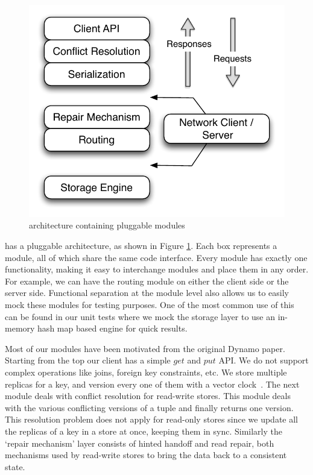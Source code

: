 \begin{figure}
  \centering
    \includegraphics[scale=0.55]{images/arch.pdf}
  \caption{\projectname{} architecture containing pluggable modules}
  \label{arch}
\end{figure}

\projectname{} has a pluggable architecture, as shown in Figure \ref{arch}. Each box represents a module, all of which share the same code interface. Every module has exactly one functionality, making it easy to interchange modules and place them in any order. For example, we can have the routing module on either the client side or the server side. Functional separation at the module level also allows us to easily mock these modules for testing purposes. One of the most common use of this can be found in our unit tests where we mock the storage layer to use an in-memory hash map based engine for quick results.  

Most of our modules have been motivated from the original Dynamo paper. Starting from the top our client has a simple $get$ and $put$ API. We do not support complex operations like joins, foreign key constraints, etc. We store multiple replicas for a key, and version every one of them with a vector clock~\cite{lamport}. The next module deals with conflict resolution for read-write stores. This module deals with the various conflicting versions of a tuple and finally returns one version. This resolution problem does not apply for read-only stores since we update all the replicas of a key in a store at once, keeping them in sync. Similarly the `repair mechanism' layer consists of hinted handoff and read repair, both mechanisms used by read-write stores to bring the data back to a consistent state. 

